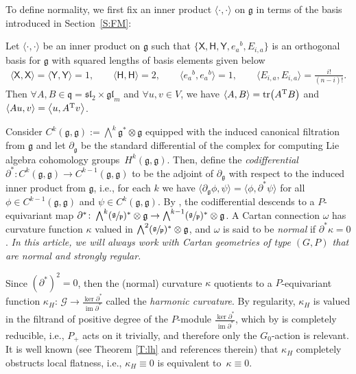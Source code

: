 \documentclass[10pt,a4paper]{amsart}
\newcommand\tensor{\otimes}
\DeclareMathOperator{\img}{im}
\DeclareMathOperator{\tr}{tr}
\newcommand{\g}{\mathfrak{g}}
\newcommand{\gl}{\mathfrak{gl}}
\newcommand\cG{\mathcal{G}}
\newcommand\fp{\mathfrak{p}}
\newcommand\fsl{\mathfrak{sl}}
\newcommand\fq {\mathfrak{q}}
\newcommand\sfX{\mathsf{X}}
\newcommand\sfH{\mathsf{H}}
\newcommand\sfY{\mathsf{Y}}
\numberwithin{equation}{section}
\begin{document}
To define normality, we first fix an inner product $\langle \cdot, \cdot \rangle$ on $\g$ in terms of the basis introduced in Section~\ref{S:FM}:

\begin{Definition}\label{D:metric}
Let $\langle \cdot, \cdot \rangle$ be an inner product on $\g$ such that $\bigl\{\sfX, \sfH, \sfY,e_a{}^b, E_{i,a}\bigr\}$ is an orthogonal basis for $\g$ with squared lengths of basis elements given below
\begin{align*}
\langle \sfX , \sfX \rangle = \langle \sfY, \sfY \rangle = 1, \qquad \langle \sfH, \sfH \rangle = 2, \qquad
\big\langle e_a{}^b, e_a{}^b \big\rangle = 1, \qquad \langle E_{i,a}, E_{i,a} \rangle = \frac{i!}{(n-i)!}.
\end{align*}
Then $\forall A, B \in \fq= \fsl_2 \times \gl_m$ and $\forall u, v \in V$, we have $\langle A, B \rangle = \tr\bigl(A^{\rm T}B\bigr)$ and
$\langle Au , v \rangle = \big\langle u, A^{\rm T}v \big\rangle$.
\end{Definition}

Consider $C^k(\g,\g) :=\bigwedge^k\g^{\ast} \tensor \g$ equipped with the induced canonical filtration from $\g$ and let $\partial_\g$ be the standard differential of the complex for computing Lie algebra cohomology groups~$H^k\!(\g,\!\g)$. Then, define the {\em codifferential} $\partial^\ast\colon C^k(\g, \g) \to C^{k-1}(\g, \g)$ to be the adjoint of $\partial_\g$ with respect to the induced inner product from $\g$, i.e., for each $k$ we have
$\langle \partial_\g \phi , \psi \rangle = \langle \phi, \partial^\ast \psi \rangle$ for all $\phi \in C^{k-1}(\g,\g) $ and $\psi \in C^k(\g,\g)$. By \cite[Lemma~3.2]{CDT2020}, the codifferential descends to a $P$-equivariant map $\partial^\ast\colon \bigwedge^k(\sfrac{\g}{\fp})^\ast \tensor\g \to \bigwedge^{k-1}(\sfrac{\g}{\fp})^\ast \tensor\g$. A Cartan connection $\omega$ has curvature function $\kappa$ valued in $\bigwedge^2 (\sfrac{\g}{\fp})^* \otimes \g$, and $\omega$ is said to be {\em normal} if $\partial^{\ast}\kappa = 0$. {\em In this article, we will always work with Cartan geometries of type $(G,P)$ that are normal and strongly regular.}


Since $(\partial^\ast)^2 = 0$, then the (normal) curvature $\kappa$ quotients to a $P$-equivariant func\-tion $\kappa_H$: $\cG \to \frac{\ker\partial^{\ast}}{\img \partial^{\ast}}$ called the {\em harmonic curvature}. By regularity, $\kappa_H$ is valued in the filtrand of positive degree of the $P$-module $\frac{\ker\partial^{\ast}}{\img \partial^{\ast}}$, which by \cite[Corollary~3.8]{CDT2020} is completely reducible, i.e., $P_+$ acts on it trivially, and therefore only the $G_0$-action is relevant. It is well known (see Theorem \ref{T:lh} and references therein) that $\kappa_H$ completely obstructs local flatness, i.e., $\kappa_H \equiv 0$ is equivalent to~$\kappa \equiv 0$.
\end{document}

